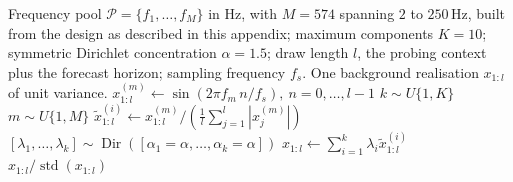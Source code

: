 \begin{algorithm}[H]
\caption{Light TSMixup: background generation from a sinusoidal frequency pool}%
\label{alg:light_tsmixup}
\begin{algorithmic}[1]
\Require Frequency pool $\mathcal{P}=\{f_1,\ldots,f_M\}$ in Hz, with $M=574$ spanning $2$ to $250$\,Hz, built from the design as described in this appendix; maximum components $K=10$; symmetric Dirichlet concentration $\alpha=1.5$; draw length $l$, the probing context plus the forecast horizon; sampling frequency $f_s$.
\Ensure One background realisation $x_{1:l}$ of unit variance.
    \State $x^{(m)}_{1:l} \gets \sin\!\left(2\pi f_m\, n / f_s\right),\ n=0,\ldots,l-1$ 
\EndFor%
\State $k \sim U\{1,K\}$ 
    \State $m \sim U\{1,M\}$ 
    \State $\tilde{x}^{(i)}_{1:l} \gets x^{(m)}_{1:l} \Big/ \left(\frac{1}{l}\sum_{j=1}^{l}\left|x^{(m)}_j\right|\right)$ 
\EndFor%
\State $[\lambda_1,\ldots,\lambda_k] \sim \operatorname{Dir}([\alpha_1=\alpha,\ldots,\alpha_k=\alpha])$ 
\State $x_{1:l} \gets \sum_{i=1}^{k}\lambda_i\tilde{x}^{(i)}_{1:l}$ 
\State \Return $x_{1:l} / \operatorname{std}\!\left(x_{1:l}\right)$ 
\end{algorithmic}
\end{algorithm}
